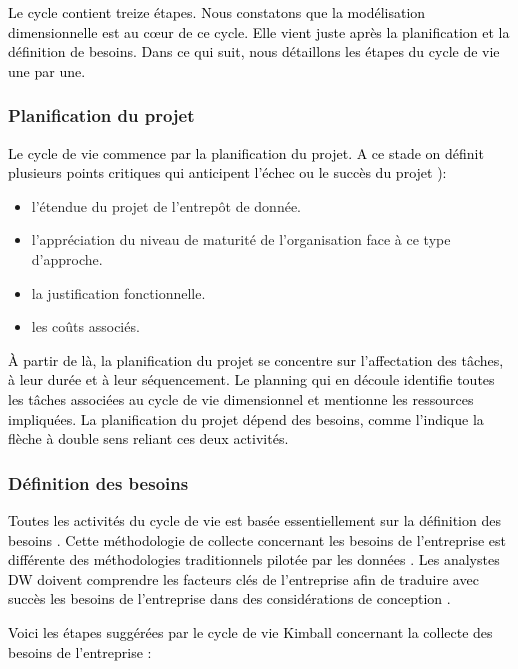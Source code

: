 \documentclass[a4paper,12pt]{report}
\begin{document}
\textcolor{black}{Le cycle contient treize étapes. Nous constatons que la modélisation dimensionnelle est au cœur de ce cycle. Elle vient juste après la planification et la définition de besoins. Dans ce qui suit, nous détaillons les étapes du cycle de vie une par une.}

\subsubsection{	Planification du projet	}
\textcolor{black}{Le cycle de vie commence par la planification du projet. A ce stade on définit plusieurs points critiques qui anticipent l’échec ou le succès du projet \citep{kimball12data}):}

\begin{itemize}
\item	l’étendue du projet de l’entrepôt de donnée. 
\item	l’appréciation du niveau de maturité de l’organisation face à ce type d’approche.
\item	la justification fonctionnelle.
\item	les coûts associés.

\end{itemize}

\textcolor{black}{À partir de là, la planification du projet se concentre sur l’affectation des tâches, à leur durée et à leur séquencement. Le planning qui en découle identifie toutes les tâches associées au cycle de vie dimensionnel et mentionne les ressources impliquées. La planification du projet dépend des besoins, comme l’indique la flèche à double sens reliant ces deux activités.}

\subsubsection{Définition des besoins}

\textcolor{black}{Toutes les activités du cycle de vie est basée essentiellement sur la définition des besoins \citep{kimball2004data}. Cette méthodologie de collecte concernant les besoins de l'entreprise est différente des méthodologies traditionnels pilotée par les données \citep{inmon2005building}. Les analystes DW doivent comprendre les facteurs clés de l'entreprise afin de traduire avec succès les besoins de l'entreprise dans des considérations de conception \citep{kimball2008data}.}

\textcolor{black}{Voici les étapes suggérées par le cycle de vie Kimball concernant la collecte des besoins de l'entreprise \citep{kimball12data}:}
\end{document}
